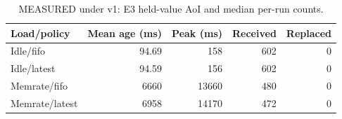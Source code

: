 \begin{table}[H]
\centering\small
\caption{MEASURED under v1: E3 held-value AoI and median per-run counts.}\label{tab:e3}
\begin{tabular}{lrrrr}
\toprule
Load/policy & Mean age (ms) & Peak (ms) & Received & Replaced \\
\midrule
Idle/fifo & 94.69 & 158 & 602 & 0 \\
Idle/latest & 94.59 & 156 & 602 & 0 \\
Memrate/fifo & 6660 & 13660 & 480 & 0 \\
Memrate/latest & 6958 & 14170 & 472 & 0 \\
\bottomrule
\end{tabular}
\end{table}
